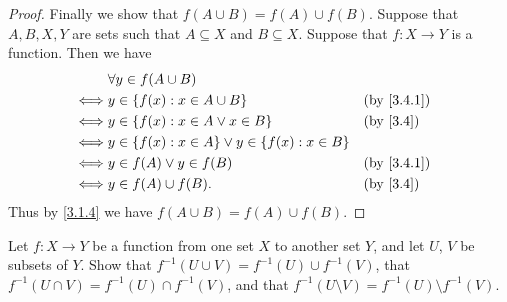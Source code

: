 \begin{proof}
  Finally we show that \(f(A \cup B) = f(A) \cup f(B)\).
  Suppose that \(A, B, X, Y\) are sets such that \(A \subseteq X\) and \(B \subseteq X\).
  Suppose that \(f : X \to Y\) is a function.
  Then we have
  \begin{align*}
         & \forall y \in f(A \cup B)                                                            \\
    \iff & y \in \{f(x) : x \in A \cup B\}                        &  & \text{(by \cref{3.4.1})} \\
    \iff & y \in \{f(x) : x \in A \lor x \in B\}                  &  & \text{(by \cref{3.4})}   \\
    \iff & y \in \{f(x) : x \in A\} \lor y \in \{f(x) : x \in B\}                               \\
    \iff & y \in f(A) \lor y \in f(B)                             &  & \text{(by \cref{3.4.1})} \\
    \iff & y \in f(A) \cup f(B).                                  &  & \text{(by \cref{3.4})}
  \end{align*}
  Thus by \cref{3.1.4} we have \(f(A \cup B) = f(A) \cup f(B)\).
\end{proof}

\begin{ex}\label{ex:3.4.4}
  Let \(f : X \to Y\) be a function from one set \(X\) to another set \(Y\), and let \(U\), \(V\) be subsets of \(Y\). Show that \(f^{-1}(U \cup V) = f^{-1}(U) \cup f^{-1}(V)\), that
  \(f^{-1}(U \cap V) = f^{-1}(U) \cap f^{-1}(V)\), and that \(f^{-1}(U \setminus V) = f^{-1}(U) \setminus f^{-1}(V)\).
\end{ex}

